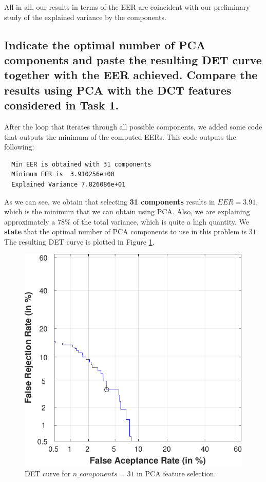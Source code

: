 \documentclass[a4paper]{article}
\begin{document}
All in all, our results in terms of the EER are coincident with our preliminary study of the explained variance by the components.




\subsection{ Indicate the optimal number of PCA components and paste the resulting DET curve together with the EER achieved. Compare the results using PCA with the DCT features considered in Task 1.}

After the loop that iterates through all possible components, we added some code that outputs the minimum of the computed EERs. This code outputs the following:

\begin{verbatim}
  Min EER is obtained with 31 components
  Minimum EER is  3.910256e+00 
  Explained Variance 7.826086e+01
\end{verbatim}

As we can see, we obtain that selecting \textbf{31 components} results in \(EER = 3.91\), which is the minimum that we can obtain using PCA. Also, we are explaining approximately a \(78\%\) of the total variance, which is quite a high quantity. We \textbf{state} that the optimal number of PCA components to use in this problem is \(31\). The resulting DET curve is plotted in Figure \ref{fig:ex2c-optim}.

\begin{figure}[H]
  \centering
  \includegraphics[scale=0.7]{Figures/DET-optim-comps-PCA}
    \caption{DET curve for \(n\_components = 31\) in PCA feature selection.}
    \label{fig:ex2c-optim}
\end{figure}
\end{document}
